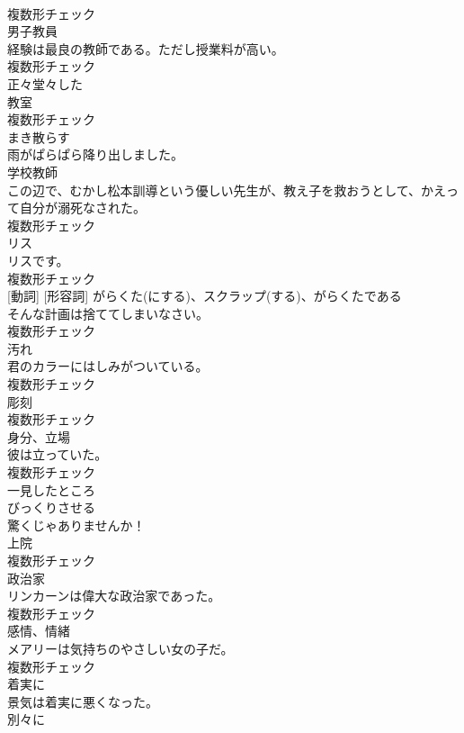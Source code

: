 \documentclass[8pt]{extreport}
\begin{document}
\begin{CJK}{UTF8}{min}
\\	複数形チェック
\\	[名詞]	男子教員	
\\	経験は最良の教師である。ただし授業料が高い。	
\\	複数形チェック
\\	[形容詞]	正々堂々した	
\\	[名詞]	教室	
\\	複数形チェック
\\	[動詞]	まき散らす	
\\	雨がぱらぱら降り出しました。	
\\	[名詞]	学校教師	
\\	この辺で、むかし松本訓導という優しい先生が、教え子を救おうとして、かえって自分が溺死なされた。	
\\	複数形チェック
\\	[名詞]	リス	
\\	リスです。	
\\	複数形チェック
\\	[名詞] [動詞] [形容詞]	がらくた(にする)、スクラップ(する)、がらくたである	
\\	そんな計画は捨ててしまいなさい。	
\\	複数形チェック
\\	[名詞]	汚れ	
\\	君のカラーにはしみがついている。	
\\	複数形チェック
\\	[名詞]	彫刻	
\\	複数形チェック
\\	[名詞]	身分、立場	
\\	彼は立っていた。	
\\	複数形チェック
\\	[副詞]	一見したところ	
\\	[動詞]	びっくりさせる	
\\	驚くじゃありませんか！	
\\	[名詞]	上院	
\\	複数形チェック
\\	[名詞]	政治家	
\\	リンカーンは偉大な政治家であった。	
\\	複数形チェック
\\	[名詞]	感情、情緒	
\\	メアリーは気持ちのやさしい女の子だ。	
\\	複数形チェック
\\	[副詞]	着実に	
\\	景気は着実に悪くなった。	
\\	[副詞]	別々に	

\end{CJK}
\end{document}
